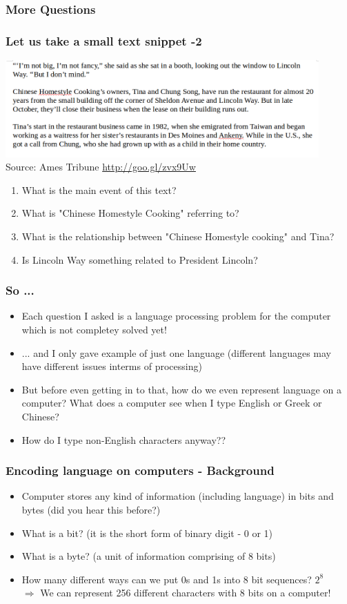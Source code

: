 \documentclass{beamer}
\begin{document}
\begin{frame}
\frametitle{More Questions}
\frametitle{Let us take a small text snippet -2}
\includegraphics[width=0.9\textwidth]{Example.png}
\\ \footnotesize{Source: Ames Tribune \url{http://goo.gl/zvx9Uw}}
\begin{enumerate}
\item What is the main event of this text? \pause
\item What is "Chinese Homestyle Cooking" referring to? \pause
\item What is the relationship between "Chinese Homestyle cooking" and Tina? \pause
\item Is Lincoln Way something related to President Lincoln?
\end{enumerate}
\end{frame}

\begin{frame}
\frametitle{So ... }
\begin{itemize}
\item Each question I asked is a language processing problem for the computer which is not completey solved yet! \pause
\item ... and I only gave example of just one language (different languages may have different issues interms of processing) \pause
\item But before even getting in to that, how do we even represent language on a computer? What does a computer see when I type English or Greek or Chinese? \pause
\item How do I type non-English characters anyway??
\end{itemize}
\end{frame}

\begin{frame}
\frametitle{Encoding language on computers - Background}
\begin{itemize}
\item Computer stores any kind of information (including language) in bits and bytes (did you hear this before?) \pause
\item What is a bit? \pause (it is the short form of binary digit - 0 or 1)
\item What is a byte? \pause (a unit of information comprising of 8 bits)
\item How many different ways can we put 0s and 1s into 8 bit sequences? \pause $2^8$
\\ $\Rightarrow$ We can represent 256 different characters with 8 bits on a computer!
\end{itemize}
\end{frame}
\end{document}
